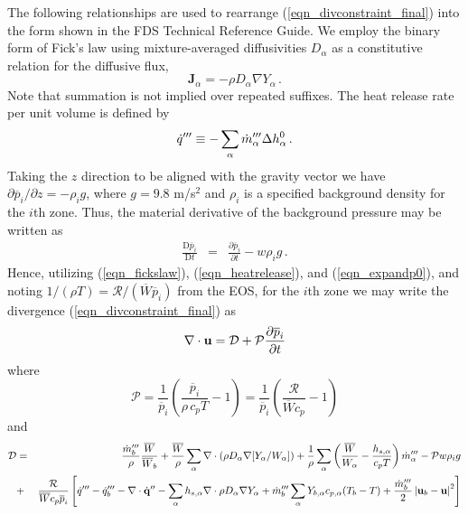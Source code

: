 \documentclass[11pt]{book}
\begin{document}
The following relationships are used to rearrange (\ref{eqn_divconstraint_final}) into
the form shown in the FDS Technical Reference Guide. We employ the binary form of Fick's law using mixture-averaged diffusivities $D_\alpha$ as a constitutive relation for the diffusive flux,
\begin{equation}
\label{eqn_fickslaw}
\mathbf{J}_{\alpha} = - \rho D_\alpha \nabla Y_\alpha \,\mbox{.}
\end{equation}
Note that summation is not implied over repeated suffixes.
The heat release rate per unit volume is defined by
\begin{equation}
\label{eqn_heatrelease}
\dot{q}^{\prime\prime\prime} \equiv -\sum_\alpha \dot{m}_{\alpha}^{\prime\prime\prime} \Delta h^0_\alpha \,\mbox{.}
\end{equation}
Taking the $z$ direction to be aligned with the gravity vector we have $\partial \overline{p}_i/\partial z = -\rho_i g$, where $g = 9.8$ m/s$^2$ and $\rho_i$ is a specified background density for the $i$th zone.
Thus, the material derivative of the background pressure may be written as
\begin{eqnarray}
\label{eqn_expandp0}
\frac{\mbox{D}\overline{p}_i}{\mbox{D}t} &=& \frac{\partial \overline{p}_i}{\partial t} - w \rho_i g \,\mbox{.}
\end{eqnarray}
Hence, utilizing (\ref{eqn_fickslaw}), (\ref{eqn_heatrelease}), and (\ref{eqn_expandp0}), and noting $1/(\rho T) = \mathcal{R}/(\overline{W} \overline{p}_i)$ from the EOS,
for the $i$th zone we may write the divergence (\ref{eqn_divconstraint_final}) as
\begin{equation}
\label{eqn_fds_divcontraint}
\nabla\cdot \mathbf{u} = \mathcal{D} + \mathcal{P} \frac{\partial \overline{p}_i}{\partial t}
\end{equation}
where
\begin{equation}
\label{eqn_fdsP}
\mathcal{P} = \frac{1}{\overline{p}_i}\left( \frac{\overline{p}_i}{\rho \,c_p T} - 1 \right) = \frac{1}{\overline{p}_i}\left( \frac{\mathcal{R}}{\overline{W} c_p} - 1 \right)
\end{equation}
and
\begin{eqnarray}
\label{eqn_fdsD}
\mathcal{D} &=& \frac{\dot{m}_b^\tripleprime}{\rho}\frac{\overline{W}}{\overline{W}_b} + \frac{\overline{W}}{\rho} \sum_\alpha \Div \left( \rho D_\alpha \nabla[Y_\alpha/W_\alpha] \right) + \frac{1}{\rho}\sum_\alpha \left( \frac{\overline{W}}{W_\alpha} - \frac{h_{s,\alpha}}{c_p T} \right) \dot{m}_{\alpha}^\tripleprime  - \mathcal{P} w \rho_i g \nonumber \vspace{0.3cm} \\
&+& \frac{\mathcal{R}}{\overline{W} c_p \overline{p}_i} \left[ \dot{q}^\tripleprime - \dq_b''' - \Div \dot{\mathbf{q}}^{\prime\prime} - \sum_\alpha h_{s,\alpha} \Div \rho D_\alpha \nabla Y_\alpha + \dot{m}_{b}^{\tripleprime} \sum_\alpha Y_{b,\alpha} c_{p,\alpha}(T_b-T) + \frac{\dot{m}_{b}^{\tripleprime}}{2}\left|\mathbf{u}_b-\mathbf{u}\right|^2  \right] \nonumber \vspace{0.3cm} \\
\end{eqnarray}
\end{document}
